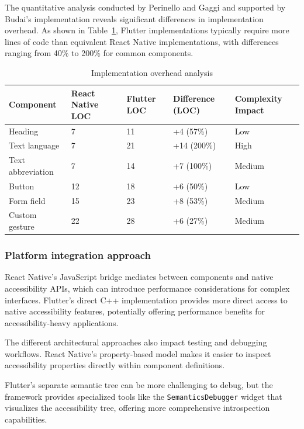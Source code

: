 The quantitative analysis conducted by Perinello and Gaggi \cite{perinello2024accessibility} and supported by Budai's implementation \cite{budai2024mobile} reveals significant differences in implementation overhead. As shown in Table~\ref{tab:implementation_overhead_comparison}, Flutter implementations typically require more lines of code than equivalent React Native implementations, with differences ranging from 40\% to 200\% for common components.

\begin{table}[ht]
\caption{Implementation overhead analysis}
\label{tab:implementation_overhead_comparison}
\centering
\begin{tabular}{|p{2.5cm}|p{2.5cm}|p{2.5cm}|p{2.5cm}|p{2.5cm}|}
\hline
\textbf{Component} & \textbf{React Native LOC} & \textbf{Flutter LOC} & \textbf{Difference (LOC)} & \textbf{Complexity Impact} \\
\hline
Heading & 7 & 11 & +4 (57\%) & Low \\
\hline
Text language & 7 & 21 & +14 (200\%) & High \\
\hline
Text abbreviation & 7 & 14 & +7 (100\%) & Medium \\
\hline
Button & 12 & 18 & +6 (50\%) & Low \\
\hline
Form field & 15 & 23 & +8 (53\%) & Medium \\
\hline
Custom gesture & 22 & 28 & +6 (27\%) & Medium \\
\hline
\end{tabular}
\end{table}

\pagebreak

\subsubsection{Platform integration approach}
React Native's JavaScript bridge mediates between components and native accessibility APIs, which can introduce performance considerations for complex interfaces. Flutter's direct C++ implementation provides more direct access to native accessibility features, potentially offering performance benefits for accessibility-heavy applications.

The different architectural approaches also impact testing and debugging workflows. React Native's property-based model makes it easier to inspect accessibility properties directly within component definitions.

Flutter's separate semantic tree can be more challenging to debug, but the framework provides specialized tools like the \texttt{SemanticsDebugger} widget that visualizes the accessibility tree, offering more comprehensive introspection capabilities.

